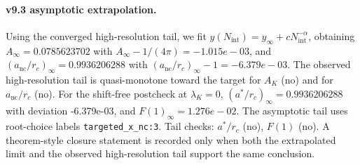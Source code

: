 \paragraph{v9.3 asymptotic extrapolation.}
Using the converged high-resolution tail, we fit $y(N_{\mathrm{int}})=y_{\infty}+cN_{\mathrm{int}}^{-\alpha}$, obtaining $A_\infty=0.0785623702$ with $A_\infty-1/(4\pi)=-1.015e-03$, and $(a_{\mathrm{nc}}/r_c)_\infty=0.9936206288$ with $(a_{\mathrm{nc}}/r_c)_\infty-1=-6.379e-03$. The observed high-resolution tail is quasi-monotone toward the target for $A_K$ (no) and for $a_{\mathrm{nc}}/r_c$ (no). For the shift-free postcheck at $\lambda_K=0$, $(a^*/r_c)_\infty=0.9936206288$ with deviation -6.379e-03, and $F(1)_\infty=1.276e-02$. The asymptotic tail uses root-choice labels \texttt{targeted_x_nc:3}. Tail checks: $a^*/r_c$ (no), $F(1)$ (no). A theorem-style closure statement is recorded only when both the extrapolated limit and the
observed high-resolution tail support the same conclusion.

